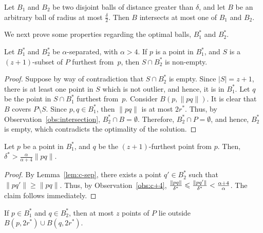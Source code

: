 \documentclass[envcountsame]{cls/cccg15}
\newcommand{\card}[1]{\left|{#1}\right|}
\newcommand{\len}[1]{\|{#1}\|}
\newcommand{\lee}{\leqslant}
\newcommand{\gee}{\geqslant}
\renewcommand{\le}{\lee}
\renewcommand{\ge}{\gee}
\begin{document}
\begin{obs}
\label{obs:intersection}
	Let $B_1$ and $B_2$ be two disjoint balls of distance greater than $\delta$,
	and let $B$ be an arbitrary ball of radius at most $\frac{\delta}{2}$. 
	Then $B$ intersects at most one of $B_1$ and $B_2$.
\end{obs}

\noindent 
We next prove some properties regarding 
the optimal balls, $B_1^*$ and $B_2^*$.

\begin{lemma}
\label{lem:c-sep}
	Let $B_1^*$ and $B_2^*$ be $\alpha$-separated, with $\alpha > 4$.
	If $p$ is a point in $B_1^*$,
	and $S$ is a $(z+1)$-subset of $P$ furthest from~$p$,
	then $S \cap B_2^*$ is non-empty.
\end{lemma}

\begin{proof}
Suppose by way of contradiction that $S \cap B_2^*$ is empty. 
Since $\card{S} = z + 1$, there is at least one point in $S$
which is not outlier, and hence, it is in $B_1^*$.
Let $q$ be the point in $S \cap B_1^*$ furthest from~$p$. 
Consider $B(p, \len{pq})$. It is clear that $B$ covers $P \setminus S$. 
Since $p, q \in B_1^*$, then $\len{pq}$ is at most $2r^*$. 
Thus, by Observation~\ref{obs:intersection}, $B_2^* \cap B = \emptyset$. 
Therefore, $B_2^* \cap P = \emptyset$, and hence,
 $B_2^*$ is empty, which contradicts the optimality of the solution.
\end{proof}

\begin{lemma}
\label{lem:(z+1)-furthest}
	Let $p$ be a point in $B_1^{*}$,
	and $q$ be the $(z+1)$-furthest point from $p$. 
	Then, $\delta^* > \frac{\alpha}{\alpha+4}\len{pq}$.
\end{lemma}

\begin{proof}
By Lemma~\ref{lem:c-sep}, there exists a point $q' \in B_2^*$ 
such that $\len{pq'} \ge \len{pq}$. 
Thus, by Observation~\ref{obs:c+4}, 
${\len{pq} \over \delta^*} \le {\len{pq'} \over \delta^*} < \frac{\alpha+4}{\alpha}$.
The claim follows immediately.
\end{proof}

\begin{lemma}
\label{lem:}
	If $p \in B_1^*$ and $q \in B_2^*$,
	then at most $z$ points of $P$ lie outside $B(p, 2r^*) \cup B(q, 2r^*)$.
\end{lemma}
\end{document}
